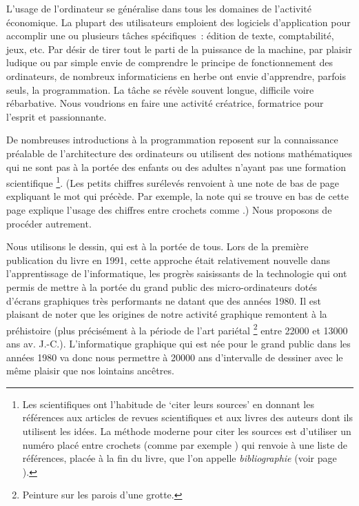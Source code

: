 L'usage de l'ordinateur se généralise dans tous les domaines de l'activité
économique. La plupart des utilisateurs emploient des logiciels 
d'ap\-pli\-ca\-tion
pour accomplir une ou plusieurs tâches spécifiques~: édition de
texte, comp\-ta\-bi\-li\-té, jeux, etc. Par désir de tirer tout le parti de la 
puissance de la machine, par plaisir ludique ou par simple
envie de comprendre le principe de fonctionnement des ordinateurs, de
nombreux informaticiens en herbe ont envie d'apprendre, parfois seuls, la
programmation. La tâche se révèle souvent longue, difficile
voire rébarbative. Nous voudrions en faire une activité créatrice,
formatrice pour l'esprit et passionnante.

\medskip

De nombreuses introductions à la programmation reposent sur la connaissance
préalable de l'architecture des ordinateurs ou utilisent des notions 
mathématiques qui ne sont pas à la portée des enfants ou des adultes
n'ayant pas une formation scientifique \cite{LT}\@%
\footnote{
Les scientifiques ont l'habitude de `citer leurs sources' en
donnant les références aux articles de revues scientifiques et aux 
livres des auteurs dont ils utilisent les idées. La méthode moderne pour
citer les sources est d'utiliser un numéro placé entre crochets 
(comme par exemple \cite{LT}) qui renvoie à une liste de 
références, placée à la fin du livre, que l'on appelle 
{\em bibliographie} (voir page 
\pageref{ch:biblio}).}. {\footnotesize (Les petits 
chiffres surélevés renvoient à une note de
 bas de page expliquant le mot qui précède. Par exemple, la note qui 
 se trouve en bas de cette page explique l'usage des chiffres entre crochets 
 comme \cite{LT}.)} Nous proposons de procéder autrement.

\medskip

Nous uti\-li\-sons le dessin, qui est à la portée de tous. Lors de la première publication du livre
en 1991, cette approche était
relativement nouvelle dans l'apprentissage de l'informatique, les progrès 
sai\-sis\-sants de la technologie qui ont permis de mettre à la portée du 
grand public des micro-ordinateurs dotés d'écrans graphiques très 
performants ne datant que des années 1980. Il est plaisant de noter que
les origines de notre activité graphique remontent à la préhistoire (plus précisément à
la période de l'art pariétal%
%
\footnote{Peinture sur les parois d'une grotte.
} entre 22000 et 13000 ans av. J.-C.). L'informatique graphique qui est née pour le grand public
dans les années 1980 va donc nous permettre à 20000 ans d'intervalle de dessiner avec 
le même plaisir que nos lointains ancêtres. 

